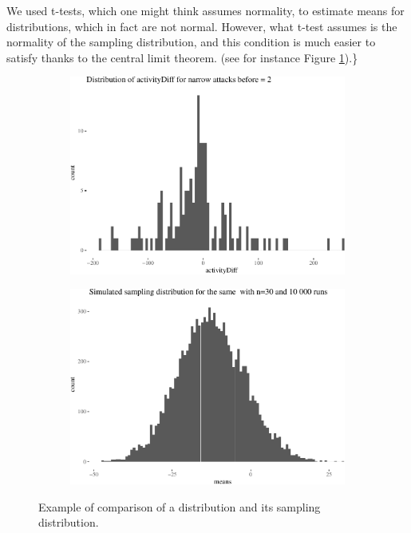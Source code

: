 \documentclass[10pt,]{scrartcl}
\begin{document}
We used t-tests, which one might think assumes normality, to estimate
means for distributions, which in fact are not normal. However, what
t-test assumes is the normality of the sampling distribution, and this
condition is much easier to satisfy thanks to the central limit theorem.
(see for instance Figure \ref{fig:sampling}).\}

\begin{figure}
\begin{subfigure}[t]{0.45\textwidth}

\begin{center}\includegraphics{redditAnalysisWalkthrough_files/figure-latex/unnamed-chunk-38-1} \end{center}
\end{subfigure}\hfill
\begin{subfigure}[t]{0.45\textwidth}

\begin{center}\includegraphics{redditAnalysisWalkthrough_files/figure-latex/unnamed-chunk-39-1} \end{center}
\end{subfigure}
\caption{Example of comparison of a distribution and its sampling distribution.}
\label{fig:sampling}
\end{figure}
\end{document}
